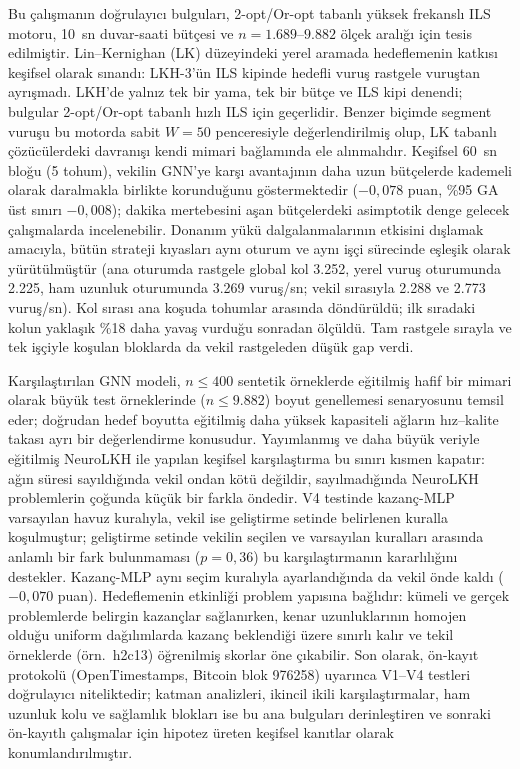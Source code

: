 Bu çalışmanın doğrulayıcı bulguları, 2-opt/Or-opt tabanlı yüksek frekanslı ILS motoru, 10~sn
duvar-saati bütçesi ve $n=1.689$--$9.882$ ölçek aralığı için tesis edilmiştir.
Lin--Kernighan (LK) düzeyindeki yerel aramada hedeflemenin katkısı keşifsel olarak sınandı:
LKH-3'ün ILS kipinde hedefli vuruş rastgele vuruştan ayrışmadı. LKH'de yalnız tek bir yama, tek
bir bütçe ve ILS kipi denendi; bulgular 2-opt/Or-opt tabanlı hızlı ILS için geçerlidir.
Benzer biçimde segment vuruşu bu motorda sabit $W=50$ penceresiyle değerlendirilmiş olup, LK
tabanlı çözücülerdeki davranışı kendi mimari bağlamında ele alınmalıdır.
Keşifsel 60~sn bloğu (5 tohum), vekilin GNN'ye karşı avantajının daha uzun bütçelerde kademeli
olarak daralmakla birlikte korunduğunu göstermektedir ($-0{,}078$ puan, \%95 GA üst sınırı
$-0{,}008$); dakika mertebesini aşan bütçelerdeki asimptotik denge gelecek çalışmalarda
incelenebilir.
Donanım yükü dalgalanmalarının etkisini dışlamak amacıyla, bütün strateji kıyasları aynı oturum ve
aynı işçi sürecinde eşleşik olarak yürütülmüştür (ana oturumda rastgele global kol 3.252, yerel
vuruş oturumunda 2.225, ham uzunluk oturumunda 3.269 vuruş/sn; vekil sırasıyla 2.288 ve
2.773 vuruş/sn).
Kol sırası ana koşuda tohumlar arasında döndürüldü; ilk sıradaki kolun yaklaşık \%18 daha yavaş
vurduğu sonradan ölçüldü. Tam rastgele sırayla ve tek işçiyle koşulan bloklarda da vekil rastgeleden
düşük gap verdi.

Karşılaştırılan GNN modeli, $n\le400$ sentetik örneklerde eğitilmiş hafif bir mimari olarak büyük
test örneklerinde ($n\le9.882$) boyut genellemesi senaryosunu temsil eder; doğrudan hedef boyutta
eğitilmiş daha yüksek kapasiteli ağların hız--kalite takası ayrı bir değerlendirme konusudur.
Yayımlanmış ve daha büyük veriyle eğitilmiş NeuroLKH ile yapılan keşifsel karşılaştırma bu sınırı
kısmen kapatır: ağın süresi sayıldığında vekil ondan kötü değildir, sayılmadığında NeuroLKH
problemlerin çoğunda küçük bir farkla öndedir.
V4 testinde kazanç-MLP varsayılan havuz kuralıyla, vekil ise geliştirme setinde belirlenen kuralla
koşulmuştur; geliştirme setinde vekilin seçilen ve varsayılan kuralları arasında anlamlı bir fark
bulunmaması ($p=0{,}36$) bu karşılaştırmanın kararlılığını destekler. Kazanç-MLP aynı seçim
kuralıyla ayarlandığında da vekil önde kaldı ($-0{,}070$ puan).
Hedeflemenin etkinliği problem yapısına bağlıdır: kümeli ve gerçek problemlerde belirgin kazançlar
sağlanırken, kenar uzunluklarının homojen olduğu uniform dağılımlarda kazanç beklendiği üzere
sınırlı kalır ve tekil örneklerde (örn.\ h2c13) öğrenilmiş skorlar öne çıkabilir.
Son olarak, ön-kayıt protokolü (OpenTimestamps, Bitcoin blok 976258) uyarınca V1--V4 testleri
doğrulayıcı niteliktedir; katman analizleri, ikincil ikili karşılaştırmalar, ham uzunluk kolu ve
sağlamlık blokları ise bu ana bulguları derinleştiren ve sonraki ön-kayıtlı çalışmalar için
hipotez üreten keşifsel kanıtlar olarak konumlandırılmıştır.
